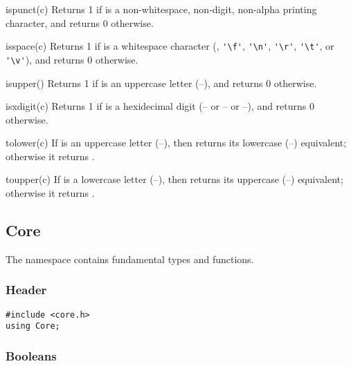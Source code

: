 \begin{defun}{ispunct}{(c)}
Returns 1 if  is a non-whitespace, non-digit, non-alpha
printing character, and returns 0 otherwise.
\end{defun}

\begin{defun}{isspace}{(c)}
Returns 1 if  is a whitespace character (,
\verb|'\f'|, \verb|'\n'|, \verb|'\r'|, \verb|'\t'|, or \verb|'\v'|),
and returns 0 otherwise.
\end{defun}

\begin{defun}{isupper}{()}
Returns 1 if  is an uppercase letter
(--), and returns 0 otherwise.
\end{defun}

\begin{defun}{isxdigit}{(c)}
Returns 1 if  is a hexidecimal digit (-- or
-- or --), and returns 0
otherwise.
\end{defun}

\begin{defun}{tolower}{(c)}
If  is an uppercase letter (--), then
 returns its lowercase (--)
equivalent; otherwise it returns .
\end{defun}

\begin{defun}{toupper}{(c)}
If  is a lowercase letter (--), then
 returns its uppercase
(--) equivalent; otherwise it returns .
\end{defun}

\subsection{Core}

The  namespace contains fundamental types and functions.

\subsubsection*{Header}
\begin{verbatim}
#include <core.h>
using Core;
\end{verbatim}

\subsubsection*{Booleans}

